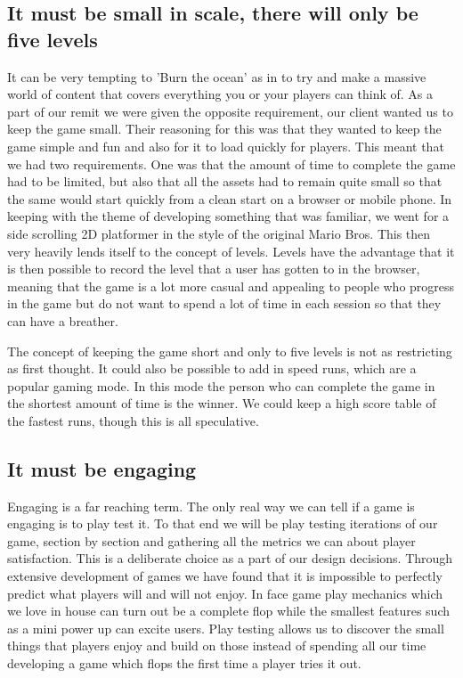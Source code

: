 \documentclass{article}
\begin{document}
\subsection{ It must be small in scale, there will only be five levels }
It can be very tempting to 'Burn the ocean' as in to try and make a massive world of content that covers everything you or your players can think of. As a part of our remit we were given the opposite requirement, our client wanted us to keep the game small. Their reasoning for this was that they wanted to keep the game simple and fun and also for it to load quickly for players.
This meant that we had two requirements. One was that the amount of time to complete the game had to be limited, but also that all the assets had to remain quite small so that the same would start quickly from a clean start on a browser or mobile phone. In keeping with the theme of developing something that was familiar, we went for a side scrolling 2D platformer in the style of the original Mario Bros. This then very heavily lends itself to the concept of levels. Levels have the advantage that it is then possible to record the level that a user has gotten to in the browser, meaning that the game is a lot more casual and appealing to people who progress in the game but do not want to spend a lot of time in each session so that they can have a breather.

The concept of keeping the game short and only to five levels is not as restricting as first thought. It could also be possible to add in speed runs, which are a popular gaming mode. In this mode the person who can complete the game in the shortest amount of time is the winner. We could keep a high score table of the fastest runs, though this is all speculative.

\subsection{ It must be engaging }
Engaging is a far reaching term. The only real way we can tell if a game is engaging is to play test it. To that end we will be play testing iterations of our game, section by section and gathering all the metrics we can about player satisfaction. This is a deliberate choice as a part of our design decisions. Through extensive development of games we have found that it is impossible to perfectly predict what players will and will not enjoy. In face game play mechanics which we love in house can turn out be a complete flop while the smallest features such as a mini power up can excite users. Play testing allows us to discover the small things that players enjoy and build on those instead of spending all our time developing a game which flops the first time a player tries it out.
\end{document}
